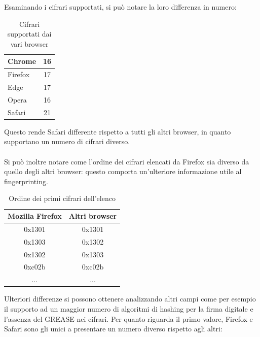 Esaminando i cifrari supportati, si può notare la loro differenza in numero:
\\
\begin{table}[H]
	\centering
	\begin{tabular}{| l | c |}
		\hline
		\rowcolor[HTML]{FDD20A}Chrome & 16
		\\
		\hline
		\rowcolor[HTML]{FF9500}Firefox & 17
		\\
		\hline
		\rowcolor[HTML]{3277BC}Edge & 17
		\\
		\hline
		\rowcolor[HTML]{CB0B1E}Opera & 16
		\\
		\hline
		\rowcolor[HTML]{0FB5EE} Safari & 21
		\\
		\hline
		
	\end{tabular}
	\caption{Cifrari supportati dai vari browser}
	\label{tab:cifrari}
\end{table}
Questo rende Safari differente rispetto a tutti gli altri browser, in quanto supportano un numero di cifrari diverso.\\
\\
Si può inoltre notare come l'ordine dei cifrari elencati da Firefox sia diverso da quello degli altri browser: questo comporta un'ulteriore informazione utile al fingerprinting.

\begin{table}[H]
	\centering
	\begin{tabular}{| c | c |}
		\hline
		Mozilla Firefox & Altri browser
		\\
		\hline
		0x1301 & 0x1301
		\\
		\hline
		0x1303 & 0x1302
		\\
		\hline
		0x1302 & 0x1303
		\\
		\hline
		0xc02b & 0xc02b
		\\
		\hline
		... & ...
		\\
		\hline
		
	\end{tabular}
	\caption{Ordine dei primi cifrari dell'elenco }
	\label{tab:cifrari}
\end{table}

 


Ulteriori differenze si possono ottenere analizzando altri campi come per esempio il supporto ad un maggior numero di algoritmi di hashing per la firma digitale e l'assenza del GREASE nei cifrari. 
Per quanto riguarda il primo valore, Firefox e Safari sono gli unici a presentare un numero diverso rispetto agli altri:

